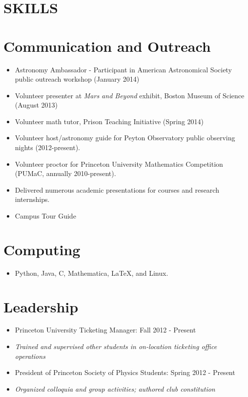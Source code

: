 \documentclass[margin]{res}
\begin{document}
\begin{resume}
\section{SKILLS}
\normalsize{\section{Communication and Outreach}}
                  \begin{itemize}
                  \item Astronomy Ambassador - Participant in American
                    Astronomical Society public outreach workshop (January 2014)
                  \item Volunteer presenter at \textit{Mars and
                    Beyond} exhibit, Boston Museum of Science (August
                    2013)
                  \item Volunteer math tutor, Prison Teaching
                      Initiative (Spring 2014)
                  \item Volunteer host/astronomy guide for Peyton Observatory public
                    observing nights (2012-present).
                  \item Volunteer proctor for Princeton University
                    Mathematics Competition (PUMaC, annually 2010-present).
                  \item Delivered numerous academic presentations for
                    courses and research internships.
                  \item Campus Tour Guide
                  \end{itemize} 
\normalsize{\section{Computing}}
                 \begin{itemize}
                 \item Python, Java, C, Mathematica, \LaTeX, and
                   Linux.
                 \end{itemize}
\normalsize{\section{Leadership}}
	           \begin{itemize} 
                   \item Princeton University Ticketing Manager: Fall
                     2012 - Present
                    \item[] \textit{Trained and supervised other
                      students in on-location ticketing office operations}
                   \item President of Princeton Society of Physics
                     Students: Spring 2012 - Present
                   	\item[] \textit{Organized colloquia and group
                          activities; authored club constitution}
                   \end{itemize}

\end{resume}
\end{document}
